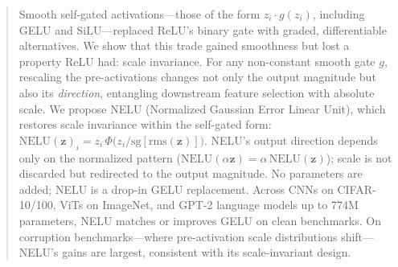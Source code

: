 \begin{abstract}
Smooth self-gated activations---those of the form $z_i \cdot g(z_i)$, including GELU and SiLU---replaced ReLU's binary gate with graded, differentiable alternatives.
We show that this trade gained smoothness but lost a property ReLU had: scale invariance.
For any non-constant smooth gate $g$, rescaling the pre-activations changes not only the output magnitude but also its \emph{direction}, entangling downstream feature selection with absolute scale.
We propose NELU (Normalized Gaussian Error Linear Unit), which restores scale invariance within the self-gated form:
$\mathrm{NELU}(\mathbf{z})_i = z_i\,\Phi\!\bigl(z_i / \mathrm{sg}[\mathrm{rms}(\mathbf{z})]\bigr)$.
NELU's output direction depends only on the normalized pattern ($\mathrm{NELU}(\alpha\mathbf{z}) = \alpha\,\mathrm{NELU}(\mathbf{z})$); scale is not discarded but redirected to the output magnitude.
No parameters are added; NELU is a drop-in GELU replacement.
Across CNNs on CIFAR-10/100, ViTs on ImageNet, and GPT-2 language models up to 774M parameters, NELU matches or improves GELU on clean benchmarks.
On corruption benchmarks---where pre-activation scale distributions shift---NELU's gains are largest, consistent with its scale-invariant design.
\end{abstract}